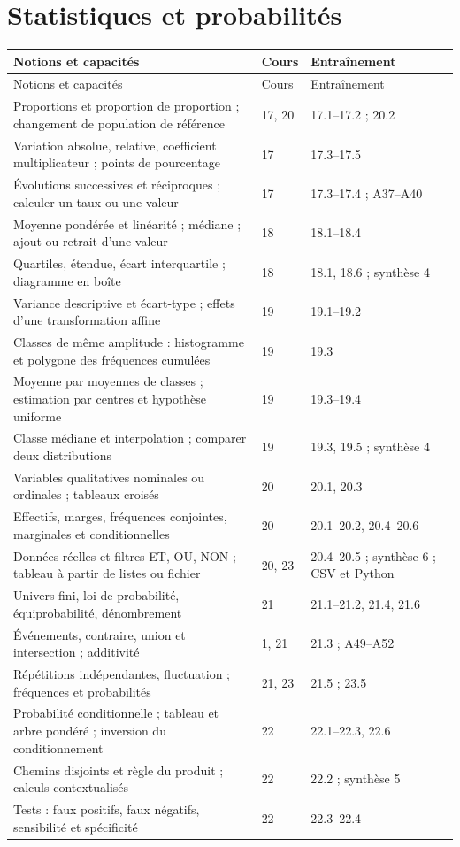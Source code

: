 \documentclass[11pt,a4paper,oneside]{book}
\begin{document}
\section{Statistiques et probabilités}
\small
\begin{longtable}{p{}p{}p{}}
\toprule Notions et capacités & Cours & Entraînement\\\midrule
\endfirsthead\toprule Notions et capacités & Cours & Entraînement\\\midrule\endhead
Proportions et proportion de proportion ; changement de population de référence & 17, 20 & 17.1--17.2 ; 20.2\\
Variation absolue, relative, coefficient multiplicateur ; points de pourcentage & 17 & 17.3--17.5\\
Évolutions successives et réciproques ; calculer un taux ou une valeur & 17 & 17.3--17.4 ; A37--A40\\
Moyenne pondérée et linéarité ; médiane ; ajout ou retrait d'une valeur & 18 & 18.1--18.4\\
Quartiles, étendue, écart interquartile ; diagramme en boîte & 18 & 18.1, 18.6 ; synthèse 4\\
Variance descriptive et écart-type ; effets d'une transformation affine & 19 & 19.1--19.2\\
Classes de même amplitude : histogramme et polygone des fréquences cumulées & 19 & 19.3\\
Moyenne par moyennes de classes ; estimation par centres et hypothèse uniforme & 19 & 19.3--19.4\\
Classe médiane et interpolation ; comparer deux distributions & 19 & 19.3, 19.5 ; synthèse 4\\
Variables qualitatives nominales ou ordinales ; tableaux croisés & 20 & 20.1, 20.3\\
Effectifs, marges, fréquences conjointes, marginales et conditionnelles & 20 & 20.1--20.2, 20.4--20.6\\
Données réelles et filtres ET, OU, NON ; tableau à partir de listes ou fichier & 20, 23 & 20.4--20.5 ; synthèse 6 ; CSV et Python\\
Univers fini, loi de probabilité, équiprobabilité, dénombrement & 21 & 21.1--21.2, 21.4, 21.6\\
Événements, contraire, union et intersection ; additivité & 1, 21 & 21.3 ; A49--A52\\
Répétitions indépendantes, fluctuation ; fréquences et probabilités & 21, 23 & 21.5 ; 23.5\\
Probabilité conditionnelle ; tableau et arbre pondéré ; inversion du conditionnement & 22 & 22.1--22.3, 22.6\\
Chemins disjoints et règle du produit ; calculs contextualisés & 22 & 22.2 ; synthèse 5\\
Tests : faux positifs, faux négatifs, sensibilité et spécificité & 22 & 22.3--22.4\\
\bottomrule\end{longtable}
\normalsize
{}
\end{document}
